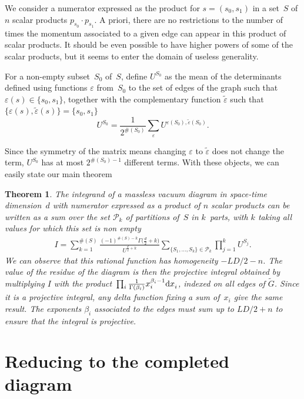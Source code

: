 \documentclass[11pt]{article}
\numberwithin{equation}{section}
\newtheorem{Theorem}{Theorem}[section]
\let\veps\varepsilon
\begin{document}
We consider a numerator expressed as the product for $s=(s_0,s_1)$ in a set~$S$ of $n$ scalar
products $p_{s_0} \cdot p_{s_1}$. A priori, there are no restrictions to the number of times the momentum
associated to a given edge can appear in this product of scalar products. It should be even possible to have higher
powers of some of the scalar products, but it seems to enter the domain of useless generality.
\begin{Definition}
For a non-empty subset~$S_0$ of~$S$, define $U^{S_0}$ as the mean of the determinants defined using
functions $\veps$ from~$S_0$ to the set of edges of the graph such that
$\veps(s) \in \{s_0,s_1\}$, together with the complementary function
$\tilde\veps$ such that $\{\veps(s),\tilde\veps(s)\} =
\{s_0,s_1\}$
\[
	U^{S_0} = \frac1 {2^{\#(S_0)}} \sum_{\veps} U^{\veps(S_0), \tilde\veps(S_0)}.
\]
\end{Definition}
Since the symmetry of the matrix means changing $\veps$
to $\tilde\veps$ does not change the term, $U^{S_0}$ has at most
$2^{\#(S_0)-1}$ different terms. With these objects, we can easily state our main theorem
\begin{Theorem}\label{fund}
The integrand of a massless vacuum diagram in space-time dimension~$d$ with numerator expressed
as a product of $n$ scalar products can be written as a sum over the set
$\mathcal P_k$ of partitions of~$S$ in $k$~parts, with $k$ taking all values for which this set is
non empty
\begin{gather*}
	I = \sum_{k=1}^{\#(S)} \frac{(-1)^{\#(S)-k}\Gamma\bigl(\frac d2 + k\bigr)}{U^{\frac d2 +k} }
			\sum_{\{S_1,\ldots,S_k\} \in \mathcal P_k} \prod_{j=1}^k U^{S_j}.
\end{gather*}
We can observe that this rational function has homogeneity $-L D/2 - n$.
The value of the residue of the diagram is then the projective integral obtained by multiplying $I$ with the
product~${\prod_i \frac 1{\Gamma(\beta_i)} x_i^{\beta_i-1} {\rm d }x_i^{\vphantom{\beta_i}}}$,
indexed on all edges of $\tilde G$. Since it is a projective integral, any delta function fixing a sum
of~$x_i$ give the same result. The exponents $\beta_i$ associated to the edges must sum up to $L D/2 + n$ to ensure that the integral is
projective.
\end{Theorem}


\section{Reducing to the completed diagram}
\end{document}
